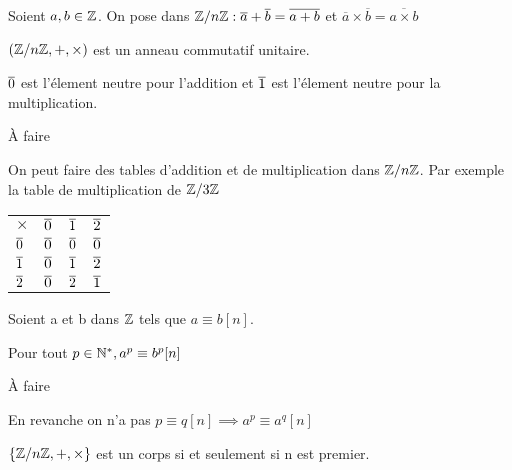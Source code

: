 \documentclass[a4paper, 12pt]{article}
\begin{document}
\begin{definition}
    Soient $a, b \in \mathbb{Z}$. On pose dans $\mathbb{Z}/n\mathbb{Z}: \overline{a} + \overline{b} = \overline{a + b}$ et $\overline{a} \times \overline{b} = \overline{a \times b}$
\end{definition}

\begin{proposition}
    $(\mathbb{Z}/n\mathbb{Z}, +, \times)$ est un anneau commutatif unitaire.

    $\overline{0}$ est l'élement neutre pour l'addition et $\overline{1}$ est l'élement neutre pour la multiplication.
\end{proposition}

\begin{demonstration}
    À faire
\end{demonstration}


\begin{example}
    On peut faire des tables d'addition et de multiplication dans $\mathbb{Z}/n\mathbb{Z}$.
    Par exemple la table de multiplication de $\mathbb{Z}/3\mathbb{Z}$
    \begin{table}[ht]
        \begin{tabular}{|l|l|l|l|}
        \hline
        $\times$  & $\overline{0}$ & $\overline{1}$ & $\overline{2}$ \\
        $\overline{0}$ & $\overline{0}$ & $\overline{0}$ & $\overline{0}$ \\
        $\overline{1}$ & $\overline{0}$ & $\overline{1}$ & $\overline{2}$ \\
        $\overline{2}$ & $\overline{0}$ & $\overline{2}$ & $\overline{1}$ \\ \hline
        \end{tabular}
    \end{table}
\end{example}

\begin{lemme}
    Soient a et b dans $\mathbb{Z}$ tels que $a \equiv b [n]$.

    Pour tout $p \in \mathbb{N}^*, a^p \equiv b^p [n]$
\end{lemme}

\begin{demonstration}
    À faire
\end{demonstration}

\begin{remark}
    En revanche on n'a pas $p \equiv q [n] \implies a^p \equiv a^q [n]$
\end{remark}

\begin{theorem}
    $\{\mathbb{Z}/n\mathbb{Z}, +, \times\}$ est un corps si et seulement si n est premier.
\end{theorem}
\end{document}
